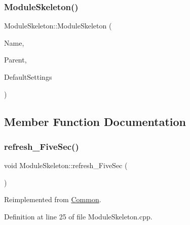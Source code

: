 \subsubsection{\texorpdfstring{Module\+Skeleton()}{ModuleSkeleton()}\hspace{0.1cm}{\footnotesize\ttfamily [2/2]}}
{\footnotesize\ttfamily Module\+Skeleton\+::\+Module\+Skeleton (\begin{DoxyParamCaption}\item[{const \+\_\+\+\_\+\+Flash\+String\+Helper $\ast$}]{Name,  }\item[{\hyperlink{class_module}{Module} $\ast$}]{Parent,  }\item[{\hyperlink{struct_settings_1_1_module_skeleton_settings}{Settings\+::\+Module\+Skeleton\+Settings} $\ast$}]{Default\+Settings }\end{DoxyParamCaption})}



\subsection{Member Function Documentation}
\mbox{\label{class_module_skeleton_a5c9845eec6ca7fbaac1521f4b021712a}} 
\subsubsection{\texorpdfstring{refresh\+\_\+\+Five\+Sec()}{refresh\_FiveSec()}\hspace{0.1cm}{\footnotesize\ttfamily [1/2]}}
{\footnotesize\ttfamily void Module\+Skeleton\+::refresh\+\_\+\+Five\+Sec (\begin{DoxyParamCaption}{ }\end{DoxyParamCaption})\hspace{0.3cm}{\ttfamily [virtual]}}



Reimplemented from \hyperlink{class_common_a604ab36b3a1d9a5bcfcb225149c82f90}{Common}.



Definition at line 25 of file Module\+Skeleton.\+cpp.

